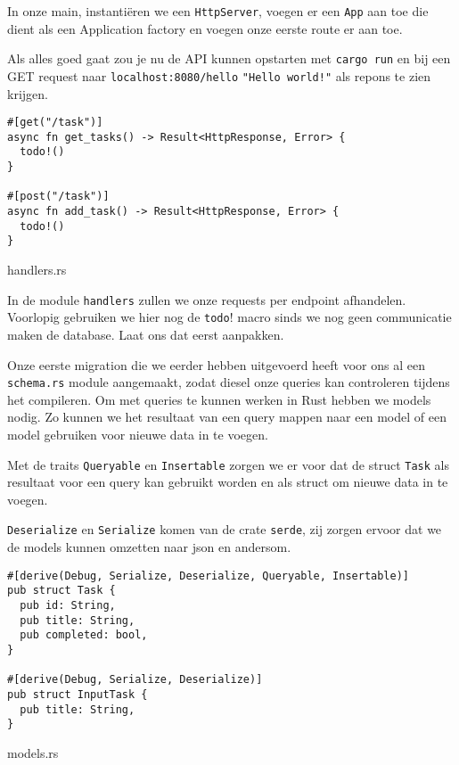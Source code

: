 In onze main, instantiëren we een \texttt{HttpServer}, voegen er een
\texttt{App} aan toe die dient als een
Application factory en voegen onze eerste route er aan toe.

Als alles goed gaat zou je nu de API kunnen opstarten met \texttt{cargo run} en bij een
GET request naar \texttt{localhost:8080/hello} \texttt{"Hello world!"} als repons 
te zien krijgen.

\begin{listing}[h]
\begin{verbatim}
#[get("/task")]
async fn get_tasks() -> Result<HttpResponse, Error> {
  todo!()
}

#[post("/task")]
async fn add_task() -> Result<HttpResponse, Error> {
  todo!()
}
\end{verbatim}
\caption{handlers.rs}
\end{listing}

In de module \texttt{handlers} zullen we onze requests per endpoint afhandelen. Voorlopig
gebruiken we hier nog de \texttt{todo}! macro sinds we nog geen communicatie maken de
database. Laat ons dat eerst aanpakken.

Onze eerste migration die we eerder hebben uitgevoerd heeft voor ons al een
\texttt{schema.rs} module aangemaakt, zodat diesel onze queries kan controleren tijdens
het compileren. Om met queries te kunnen werken in Rust hebben we models nodig. Zo kunnen we het
resultaat van een query mappen naar een model of een model gebruiken voor nieuwe data in te voegen.

Met de traits \texttt{Queryable} en \texttt{Insertable} zorgen we er voor dat de
struct \texttt{Task} als resultaat voor een query kan gebruikt worden en als struct om
nieuwe data in te voegen.

\texttt{Deserialize} en \texttt{Serialize} komen van de crate
\texttt{serde}, zij zorgen ervoor dat we de models kunnen omzetten naar json en andersom.

\clearpage

\begin{listing}[h]
\begin{verbatim}
#[derive(Debug, Serialize, Deserialize, Queryable, Insertable)]
pub struct Task {
  pub id: String,
  pub title: String,
  pub completed: bool,
}

#[derive(Debug, Serialize, Deserialize)]
pub struct InputTask {
  pub title: String,
}
\end{verbatim}
\caption{models.rs}
\end{listing}

